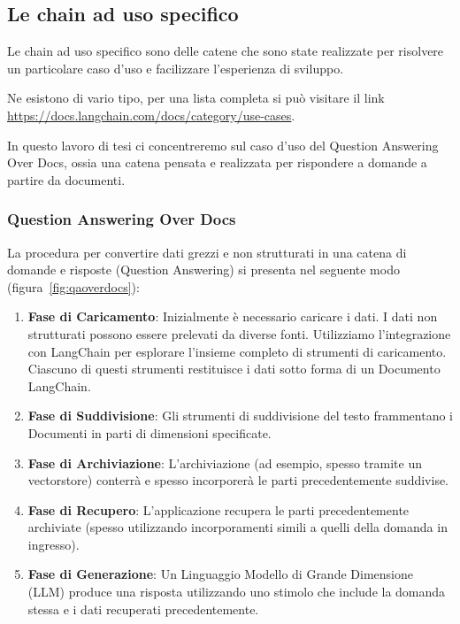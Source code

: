 \subsection[Chain specifiche]{Le chain ad uso specifico}

Le chain ad uso specifico sono delle catene che sono state realizzate per risolvere un particolare caso d'uso e facilizzare l'esperienza di sviluppo.

Ne esistono di vario tipo, per una lista completa si può visitare il link \url{https://docs.langchain.com/docs/category/use-cases}.

In questo lavoro di tesi ci concentreremo sul caso d'uso del Question Answering Over Docs, ossia una catena pensata e realizzata per rispondere a domande a partire da documenti.

\subsubsection[QA Over Docs]{Question Answering Over Docs}

La procedura per convertire dati grezzi e non strutturati in una catena di domande e risposte (Question Answering) si presenta nel seguente modo (figura~\ref{fig:qaoverdocs}):

\begin{enumerate}
    \item \textbf{Fase di Caricamento}: Inizialmente è necessario caricare i dati. I dati non strutturati possono essere prelevati da diverse fonti. Utilizziamo l'integrazione con LangChain per esplorare l'insieme completo di strumenti di caricamento. Ciascuno di questi strumenti restituisce i dati sotto forma di un Documento LangChain.
    \item \textbf{Fase di Suddivisione}: Gli strumenti di suddivisione del testo frammentano i Documenti in parti di dimensioni specificate.
    \item \textbf{Fase di Archiviazione}: L'archiviazione (ad esempio, spesso tramite un vectorstore) conterrà e spesso incorporerà le parti precedentemente suddivise.
    \item \textbf{Fase di Recupero}: L'applicazione recupera le parti precedentemente archiviate (spesso utilizzando incorporamenti simili a quelli della domanda in ingresso).
    \item \textbf{Fase di Generazione}: Un Linguaggio Modello di Grande Dimensione (LLM) produce una risposta utilizzando uno stimolo che include la domanda stessa e i dati recuperati precedentemente.
\end{enumerate}

